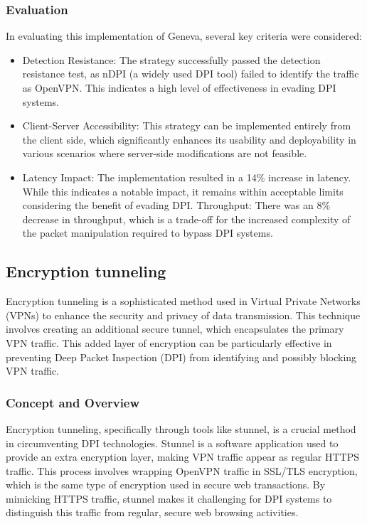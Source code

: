 \documentclass[12pt, fleqn, a4paper]{article}
\begin{document}
\subsubsection{Evaluation}
In evaluating this implementation of Geneva, several key criteria were considered:
\begin{itemize}
\item Detection Resistance: The strategy successfully passed the detection resistance test, as nDPI (a widely used DPI tool) failed to identify the traffic as OpenVPN. This indicates a high level of effectiveness in evading DPI systems.
\item Client-Server Accessibility: This strategy can be implemented entirely from the client side, which significantly enhances its usability and deployability in various scenarios where server-side modifications are not feasible.
\item Latency Impact: The implementation resulted in a 14\% increase in latency. While this indicates a notable impact, it remains within acceptable limits considering the benefit of evading DPI.
Throughput: There was an 8\% decrease in throughput, which is a trade-off for the increased complexity of the packet manipulation required to bypass DPI systems.
\end{itemize}

\subsection{Encryption tunneling}
Encryption tunneling is a sophisticated method used in Virtual Private Networks (VPNs) to enhance the security and privacy of data transmission. This technique involves creating an additional secure tunnel, which encapsulates the primary VPN traffic. This added layer of encryption can be particularly effective in preventing Deep Packet Inspection (DPI) from identifying and possibly blocking VPN traffic.
\subsubsection{Concept and Overview}
Encryption tunneling, specifically through tools like stunnel, is a crucial method in circumventing DPI technologies. Stunnel is a software application used to provide an extra encryption layer, making VPN traffic appear as regular HTTPS traffic. This process involves wrapping OpenVPN traffic in SSL/TLS encryption, which is the same type of encryption used in secure web transactions. By mimicking HTTPS traffic, stunnel makes it challenging for DPI systems to distinguish this traffic from regular, secure web browsing activities.
\end{document}
